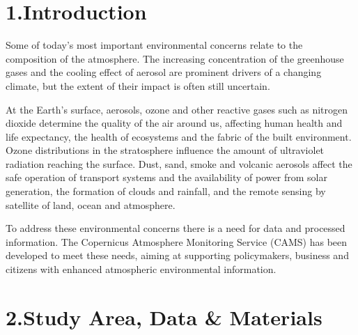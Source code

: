 \documentclass[9pt]{report}
\begin{document}
\mdxtitleblockstart{}

\mdxauthorstart{}
\mdxauthorend\mdtitleauthorrunning{}{}\mdxtitleblockend%

\section{1.\hspace*{0.5em}Introduction}\label{sec-introduction}%

\noindent{}Some of today’s most important environmental concerns relate to the 
composition of the atmosphere. The increasing concentration of the 
greenhouse gases and the cooling effect of aerosol are prominent 
drivers of a changing climate, but the extent of their impact is 
often still uncertain.%

At the Earth’s surface, aerosols, ozone and other reactive gases such as 
nitrogen dioxide determine the quality of the air around us, affecting 
human health and life expectancy, the health of ecosystems and the 
fabric of the built environment. Ozone distributions in the stratosphere 
influence the amount of ultraviolet radiation reaching the surface. 
Dust, sand, smoke and volcanic aerosols affect the safe operation of 
transport systems and the availability of power from solar generation, 
the formation of clouds and rainfall, and the remote sensing by satellite 
of land, ocean and atmosphere.%

To address these environmental concerns there is a need for data and 
processed information. The Copernicus Atmosphere Monitoring Service (CAMS) 
has been developed to meet these needs, aiming at supporting policymakers, 
business and citizens with enhanced atmospheric environmental information.%

\section{2.\hspace*{0.5em}Study Area, Data \& Materials}\label{sec-study-area-data-materials}%
\end{document}
